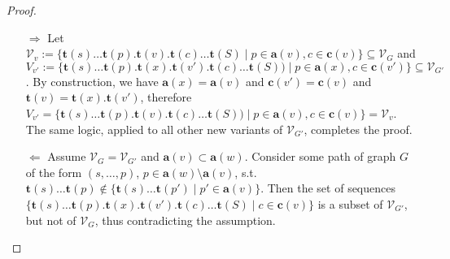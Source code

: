 \documentclass[a4paper]{article}
\newtheorem{conjecture}{Conjecture}
\newcommand{\prefix}{\mathbf{p}}
\newcommand{\parent}{\mathbf{a}}
\newcommand{\child}{\mathbf{c}}
\newcommand{\seq}{\mathbf{t}}
\begin{document}
\begin{proof}
    \begin{enumerate}
        \item[$\Rightarrow$] Let $\mathcal V_v := 
            \{\seq(s)\ldots\seq(p).\seq(v).\seq(c)\ldots\seq(S) \mid p \in
            \parent(v), c \in \child(v) \} \subseteq \mathcal V_{G}$ and 
            $V_{v'} :=
            \{\seq(s)\ldots\seq(p).\seq(x).\seq(v').\seq(c)\ldots\seq(S)) \mid
            p \in \parent(x), c \in \child(v') \}\subseteq \mathcal V_{G'}$.
            By construction, we have $\parent(x) = \parent(v)$ and $\child(v')
            = \child(v)$ and $\seq(v) = \seq(x).\seq(v')$, therefore $V_{v'} =
            \{\seq(s)\ldots\seq(p).\seq(v).\seq(c)\ldots\seq(S)) \mid p \in
            \parent(v), c \in \child(v) \} = \mathcal V_v$. The same logic,
            applied to all other new variants of $\mathcal V_{G'}$, completes
            the proof. 

    \item[$\Leftarrow$] Assume $\mathcal V_G = \mathcal V_{G'}$ and $\parent(v)
        \subset \parent(w)$. Consider some path of graph $G$ of the form $(s,
        \ldots, p)$, $p \in \parent(w) \setminus \parent(v)$, s.t.
        $\seq(s)\ldots\seq(p) \not\in \{\seq(s)\ldots\seq(p') \mid p' \in
        \parent(v)\}$. Then the set of sequences
        $\{\seq(s)\ldots\seq(p).\seq(x).\seq(v').\seq(c)\ldots\seq(S) \mid c
        \in \child(v)\}$ is a subset of $\mathcal V_{G'}$, but not of $\mathcal
        V_{G}$, thus contradicting the assumption. 
    \end{enumerate}
\end{proof}

\end{document}
